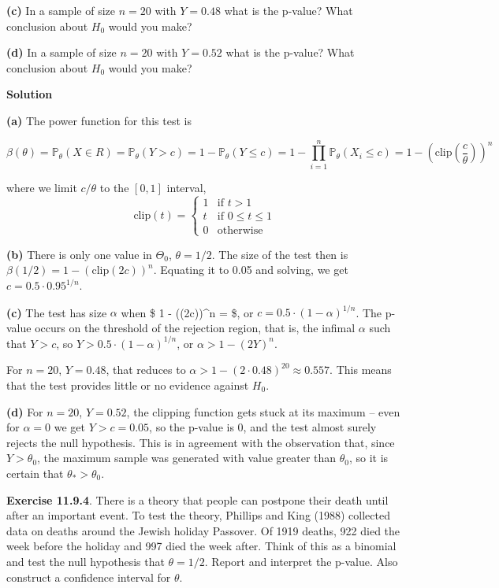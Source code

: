 \textbf{(c)} In a sample of size \(n = 20\) with \(Y = 0.48\) what is
the p-value? What conclusion about \(H_0\) would you make?

\textbf{(d)} In a sample of size \(n = 20\) with \(Y = 0.52\) what is
the p-value? What conclusion about \(H_0\) would you make?

\textbf{Solution}

\textbf{(a)} The power function for this test is

\[\beta(\theta) = \mathbb{P}_\theta(X \in R) = \mathbb{P}_\theta(Y > c) = 1 - \mathbb{P}_\theta(Y \leq c) = 1 - \prod_{i=1}^n \mathbb{P}_\theta(X_i \leq c) = 1 - \left(\text{clip}\left(\frac{c}{\theta}\right)\right)^n\]

where we limit \(c/\theta\) to the \([0, 1]\) interval,
\[\text{clip}(t) = \begin{cases} 1 & \text{if } t > 1 \\ t & \text{if } 0 \leq t \leq 1 \\ 0 & \text{otherwise} \end{cases}\]

\textbf{(b)} There is only one value in \(\Theta_0\), \(\theta = 1/2\).
The size of the test then is
\(\beta(1/2) = 1 - \left(\text{clip}\left(2c\right)\right)^n\). Equating
it to 0.05 and solving, we get \(c = 0.5 \cdot 0.95^{1/n}\).

\textbf{(c)} The test has size \(\alpha\) when \$ 1 -
\left(\left(2c\right)\right)\^{}n = \alpha\$, or
\(c = 0.5 \cdot (1 - \alpha)^{1/n}\). The p-value occurs on the
threshold of the rejection region, that is, the infimal \(\alpha\) such
that \(Y > c\), so \(Y > 0.5 \cdot (1 - \alpha)^{1/n}\), or
\(\alpha > 1 - (2Y)^n\).

For \(n = 20\), \(Y = 0.48\), that reduces to
\(\alpha > 1 - (2\cdot 0.48)^{20} \approx 0.557\). This means that the
test provides little or no evidence against \(H_0\).

\textbf{(d)} For \(n = 20\), \(Y = 0.52\), the clipping function gets
stuck at its maximum -- even for \(\alpha = 0\) we get \(Y > c = 0.05\),
so the p-value is 0, and the test almost surely rejects the null
hypothesis. This is in agreement with the observation that, since
\(Y > \theta_0\), the maximum sample was generated with value greater
than \(\theta_0\), so it is certain that \(\theta_* > \theta_0\).

\textbf{Exercise 11.9.4}. There is a theory that people can postpone
their death until after an important event. To test the theory, Phillips
and King (1988) collected data on deaths around the Jewish holiday
Passover. Of 1919 deaths, 922 died the week before the holiday and 997
died the week after. Think of this as a binomial and test the null
hypothesis that \(\theta = 1/2\). Report and interpret the p-value. Also
construct a confidence interval for \(\theta\).

